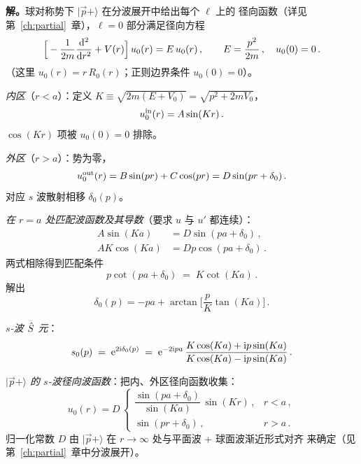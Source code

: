 \textbf{解。}\quad 球对称势下 $|\vec p+\rangle$ 在分波展开中给出每个 $\ell$ 上的
径向函数（详见第~\ref{ch:partial}~章），$\ell=0$ 部分满足径向方程
\begin{equation}
  \Big[-\frac{1}{2m}\frac{\mathrm{d}^2}{\mathrm{d} r^2} + V(r)\Big]\,u_0(r) = E\,u_0(r)\,,
  \qquad E = \frac{p^2}{2m}\,,\quad u_0(0)=0\,.
\end{equation}
（这里 $u_0(r) = r\,R_0(r)$；正则边界条件 $u_0(0)=0$）。

\emph{内区}（$r<a$）：定义 $K\equiv \sqrt{2m(E+V_0)} = \sqrt{p^2 + 2m V_0}$，
\begin{equation}
  u_0^{\rm in}(r) = A\sin(Kr)\,.
  \label{eq:stat-square-in}
\end{equation}
$\cos(Kr)$ 项被 $u_0(0)=0$ 排除。

\emph{外区}（$r>a$）：势为零，
\begin{equation}
  u_0^{\rm out}(r) = B\sin(pr) + C\cos(pr) = D\sin(pr+\delta_0)\,.
  \label{eq:stat-square-out}
\end{equation}
对应 $s$ 波散射相移 $\delta_0(p)$。

\emph{在 $r=a$ 处匹配波函数及其导数}（要求 $u$ 与 $u'$ 都连续）：
\begin{align}
  A\sin(Ka) &= D\sin(pa+\delta_0)\,,\\
  A K\cos(Ka) &= D p\cos(pa+\delta_0)\,.
\end{align}
两式相除得到匹配条件
\begin{equation}
  \boxed{\;p\cot(pa+\delta_0) \;=\; K\cot(Ka)\,.\;}
  \label{eq:stat-square-match}
\end{equation}
解出
\begin{equation}
  \delta_0(p) = -pa + \arctan\!\Big[\frac{p}{K}\tan(Ka)\Big]\,.
  \label{eq:stat-square-delta0}
\end{equation}

\emph{$s$-波 $\hat{S}$ 元}：
\begin{equation}
  s_0(p) \;=\; \mathrm{e}^{2\mathrm{i}\delta_0(p)}
  \;=\; \mathrm{e}^{-2\mathrm{i} pa}\,
        \frac{K\cos(Ka) + \mathrm{i} p\sin(Ka)}{K\cos(Ka) - \mathrm{i} p\sin(Ka)}\,.
  \label{eq:stat-square-s0}
\end{equation}

\emph{$|\vec p+\rangle$ 的 $s$-波径向波函数}：把内、外区径向函数收集：
\begin{equation}
  u_0(r) = D\,\begin{cases}
    \dfrac{\sin(pa+\delta_0)}{\sin(Ka)}\,\sin(Kr)\,, & r<a\,,\\[6pt]
    \sin(pr+\delta_0)\,, & r>a\,.
  \end{cases}
  \label{eq:stat-square-u0}
\end{equation}
归一化常数 $D$ 由 $|\vec p+\rangle$ 在 $r\to\infty$ 处与平面波 + 球面波渐近形式对齐
来确定（见第~\ref{ch:partial}~章中分波展开）。

